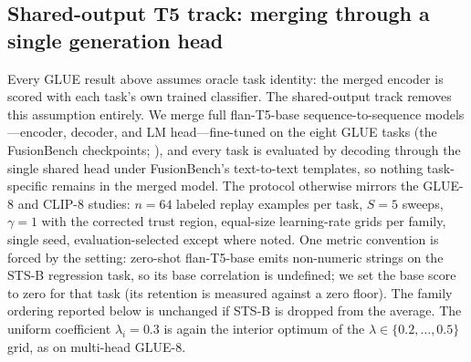 \documentclass[11pt]{article}
\begin{document}
\subsection{Shared-output T5 track: merging through a single generation head}
\label{sec:t5}

Every GLUE result above assumes oracle task identity: the merged encoder is scored with each task's own trained classifier. The shared-output track removes this assumption entirely. We merge full flan-T5-base sequence-to-sequence models---encoder, decoder, and LM head---fine-tuned on the eight GLUE tasks (the FusionBench checkpoints; \citealp{raffel2020t5,tang2024fusionbench}), and every task is evaluated by decoding through the single shared head under FusionBench's text-to-text templates, so nothing task-specific remains in the merged model. The protocol otherwise mirrors the GLUE-8 and CLIP-8 studies: $n=64$ labeled replay examples per task, $S=5$ sweeps, $\gamma=1$ with the corrected trust region, equal-size learning-rate grids per family, single seed, evaluation-selected except where noted. One metric convention is forced by the setting: zero-shot flan-T5-base emits non-numeric strings on the STS-B regression task, so its base correlation is undefined; we set the base score to zero for that task (its retention is measured against a zero floor). The family ordering reported below is unchanged if STS-B is dropped from the average. The uniform coefficient $\lambda_i=0.3$ is again the interior optimum of the $\lambda\in\{0.2,\ldots,0.5\}$ grid, as on multi-head GLUE-8.
\end{document}
